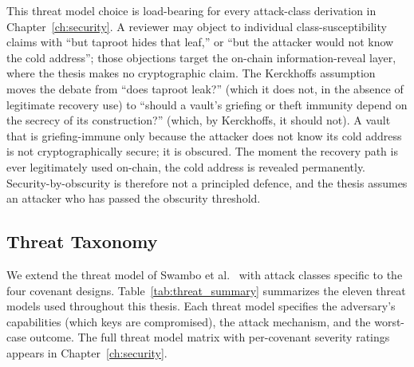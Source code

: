 This threat model choice is load-bearing for every attack-class
derivation in Chapter~\ref{ch:security}. A reviewer may object to
individual class-susceptibility claims with ``but taproot hides that
leaf,'' or ``but the attacker would not know the cold address''; those
objections target the on-chain information-reveal layer, where the
thesis makes no cryptographic claim. The Kerckhoffs assumption moves
the debate from ``does taproot leak?'' (which it does not, in the
absence of legitimate recovery use) to ``should a vault's griefing or
theft immunity depend on the secrecy of its construction?'' (which,
by Kerckhoffs, it should not). A vault that is griefing-immune only
because the attacker does not know its cold address is not
cryptographically secure; it is obscured. The moment the recovery path
is ever legitimately used on-chain, the cold address is revealed
permanently. Security-by-obscurity is therefore not a principled
defence, and the thesis assumes an attacker who has passed the
obscurity threshold.

\subsection{Threat Taxonomy} \label{ss:threat_taxonomy}

We extend the threat model of Swambo et al.~\cite{SHMB20} with attack classes
specific to the four covenant designs. Table~\ref{tab:threat_summary} summarizes the
eleven threat models used throughout this thesis. Each threat model specifies the
adversary's capabilities (which keys are compromised), the attack mechanism, and the
worst-case outcome. The full threat model matrix with per-covenant severity ratings
appears in Chapter~\ref{ch:security}.

